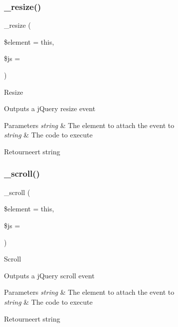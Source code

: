 \subsubsection{\texorpdfstring{\_resize()}{\_resize()}}
{\footnotesize\ttfamily \+\_\+resize (\begin{DoxyParamCaption}\item[{}]{\$element = {\ttfamily \textquotesingle{}this\textquotesingle{}},  }\item[{}]{\$js = {\ttfamily \textquotesingle{}\textquotesingle{}} }\end{DoxyParamCaption})\hspace{0.3cm}{\ttfamily [protected]}}

Resize

Outputs a j\+Query resize event


\begin{DoxyParams}{Parameters}
{\em string} & The element to attach the event to \\
\hline
{\em string} & The code to execute \\
\hline
\end{DoxyParams}
\begin{DoxyReturn}{Retourneert}
string 
\end{DoxyReturn}
\mbox{\label{class_c_i___jquery_a8242a35dd382dd24e4bb7eaba2be2982}} 
\subsubsection{\texorpdfstring{\_scroll()}{\_scroll()}}
{\footnotesize\ttfamily \+\_\+scroll (\begin{DoxyParamCaption}\item[{}]{\$element = {\ttfamily \textquotesingle{}this\textquotesingle{}},  }\item[{}]{\$js = {\ttfamily \textquotesingle{}\textquotesingle{}} }\end{DoxyParamCaption})\hspace{0.3cm}{\ttfamily [protected]}}

Scroll

Outputs a j\+Query scroll event


\begin{DoxyParams}{Parameters}
{\em string} & The element to attach the event to \\
\hline
{\em string} & The code to execute \\
\hline
\end{DoxyParams}
\begin{DoxyReturn}{Retourneert}
string 
\end{DoxyReturn}
\mbox{\label{class_c_i___jquery_afc1e291a9264809af8cbb0bb4a30dcb2}} 
